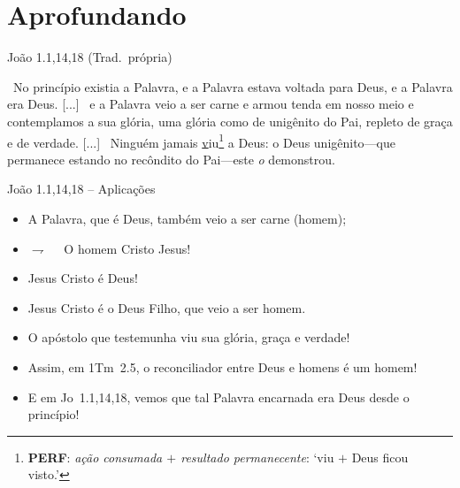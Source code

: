 \documentclass[12pt,aspectratio=169]{beamer}
\newcommand{\ver}[1]{%
    \raisebox{0.50ex}{%
        \scalebox{1.1}{%
            \pmb{\textbf{\textcolor{BSpbg}{#1}}}%
        }%
    }%
}
\newcommand{\QUOTE}[1]{%
    \par\noindent\hspace*{0.1\linewidth}%
    \begin{minipage}{0.8\linewidth}%
        \linespread{1.35}\large{#1}%
    \end{minipage}%
}
\newcommand{\RED}[1]{{\textcolor{TXred}{#1}}}
\newcommand{\YEL}[1]{{\textcolor{TXyel}{#1}}}
\newcommand{\BLU}[1]{{\textcolor{TXblu}{#1}}}
\newcommand{\MAG}[1]{{\textcolor{TXmag}{#1}}}
\newcommand{\BRI}[1]{{\textcolor{BSpbg}{#1}}}   %
\begin{document}
\section{Aprofundando}

    \begin{frame}{João 1.1,14,18 (Trad.~própria)}
        \QUOTE{%
            \normalsize
            \ver{1}~No princípio existia \MAG{a Palavra}, e \MAG{a Palavra}  estava  voltada
            para \BRI{Deus}, e \MAG{a Palavra era Deus}.  [...]  \ver{14}~e  \MAG{a  Palavra
            veio a ser carne} e armou tenda em nosso meio e contemplamos a sua \YEL{glória},
            uma \YEL{glória} como de unigênito do \BRI{Pai}, repleto  de  \YEL{graça}  e  de
            \YEL{verdade}.             [...]             \ver{18}~Ninguém             jamais
            \underline{v}iu\footnote{\textbf{\textsf{PERF}}:  \textit{ação  consumada  $+$  resultado
            permanecente\/}:  `viu  $+$  Deus  ficou  visto.'}  a  \BRI{Deus}:  o  \MAG{Deus
            unigênito}---que  permanece  estando  no  recôndito  do  \BRI{Pai}---este   {\it
            \BRI{o}} demonstrou.
        }
    \end{frame}

    \begin{frame}{João 1.1,14,18 -- Aplicações}
        \begin{itemize}
            \item<1-> A \MAG{Palavra}, que é \BLU{Deus}, também veio a ser \RED{carne} (homem);
            \item<2-> $\rightharpoondown\quad$ O homem \MAG{Cristo Jesus}!
            \item<3-> Jesus Cristo \YEL{é Deus}!$\qquad$\uncover<4->{\BRI{Ele é o meu Deus!}}
            \item<5-> Jesus Cristo \YEL{é} o \BLU{Deus Filho}, que veio a ser \RED{homem}.
            \item<6-> O apóstolo que testemunha viu sua \YEL{glória}, \YEL{graça} e
                \YEL{verdade}! \\[\bigskipamount]
            \item<7-> Assim, em 1Tm~2.5, o reconciliador entre \BLU{Deus} e \RED{homens} é um
                \MAG{homem}!
            \item<8-> E em Jo~1.1,14,18, vemos que tal \MAG{Palavra} \RED{encarnada} era
                \BLU{Deus} desde o princípio!
        \end{itemize}
    \end{frame}

\end{document}
